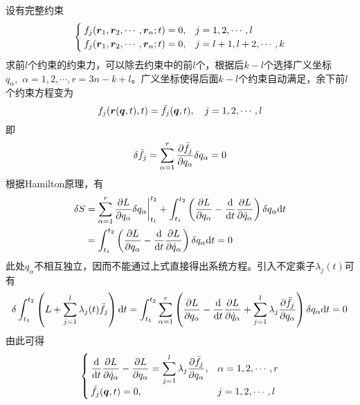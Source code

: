设有完整约束
\begin{equation*}
	\begin{cases}
		f_j(\boldsymbol{r}_1,\boldsymbol{r}_2,\cdots,\boldsymbol{r}_n;t) = 0, & j = 1,2,\cdots,l \\
		f_j(\boldsymbol{r}_1,\boldsymbol{r}_2,\cdots,\boldsymbol{r}_n;t) = 0, & j = l+1,l+2,\cdots,k
	\end{cases}
\end{equation*}
求前$l$个约束的约束力，可以除去约束中的前$l$个，根据后$k-l$个选择广义坐标$q_\alpha,\,\,\alpha=1,2,\cdots,r = 3n-k+l$。广义坐标使得后面$k-l$个约束自动满足，余下前$l$个约束方程变为
\begin{equation*}
	f_j(\boldsymbol{r}(\boldsymbol{q},t),t) = \bar{f}_j(\boldsymbol{q},t),\quad j=1,2,\cdots,l
\end{equation*}
即
\begin{equation*}
	\delta \bar{f}_j = \sum_{\alpha=1}^r \frac{\partial \bar{f}_j}{\partial q_\alpha} \delta q_\alpha = 0
\end{equation*}
根据Hamilton原理，有
\begin{align*}
	\delta S & = \sum_{\alpha=1}^r \frac{\partial L}{\partial q_\alpha} \delta q_\alpha\bigg|_{t_1}^{t_2} + \int_{t_1}^{t_2} \left(\frac{\partial L}{\partial q_\alpha} - \frac{\mathrm{d}}{\mathrm{d} t} \frac{\partial L}{\partial \dot{q}_\alpha} \right) \delta q_\alpha \mathrm{d} t \\
	& = \int_{t_1}^{t_2} \left(\frac{\partial L}{\partial q_\alpha} - \frac{\mathrm{d}}{\mathrm{d} t} \frac{\partial L}{\partial \dot{q}_\alpha} \right) \delta q_\alpha \mathrm{d} t = 0
\end{align*}
此处$q_\alpha$不相互独立，因而不能通过上式直接得出系统方程。引入不定乘子$\lambda_j(t)$可有
\begin{equation*}
	\delta \int_{t_1}^{t_2} \left(L+\sum_{j=1}^l \lambda_j(t) \bar{f}_j\right) \mathrm{d} t = \int_{t_1}^{t_2} \sum_{\alpha=1}^r \left(\frac{\partial L}{\partial q_\alpha} - \frac{\mathrm{d}}{\mathrm{d} t} \frac{\partial L}{\partial \dot{q}_\alpha} + \sum_{j=1}^l \lambda_j \frac{\partial \bar{f}_j}{\partial q_\alpha} \right) \delta q_\alpha \mathrm{d} t = 0
\end{equation*}
由此可得
\begin{equation}
	\begin{cases}
		\displaystyle \frac{\mathrm{d}}{\mathrm{d} t} \frac{\partial L}{\partial \dot{q}_\alpha} - \frac{\partial L}{\partial q_\alpha} = \sum_{j=1}^l \lambda_j \frac{\partial \bar{f}_j}{\partial q_\alpha},& \alpha=1,2,\cdots,r \\
		\bar{f}_j(\boldsymbol{q},t) = 0, & j=1,2,\cdots,l
	\end{cases}
\end{equation}
